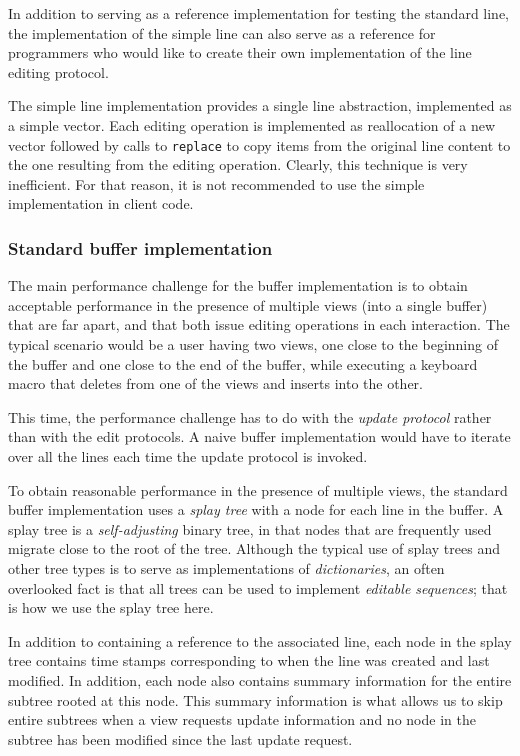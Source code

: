 In addition to serving as a reference implementation for testing the
standard line, the implementation of the simple line can also serve as
a reference for programmers who would like to create their own
implementation of the line editing protocol.

The simple line implementation provides a single line abstraction,
implemented as a \commonlisp{} simple vector.  Each editing operation
is implemented as reallocation of a new vector followed by calls to
\texttt{replace} to copy items from the original line content to the
one resulting from the editing operation.  Clearly, this technique is
very inefficient.  For that reason, it is not recommended to use the
simple implementation in client code.

\subsubsection{Standard buffer implementation}

The main performance challenge for the buffer implementation is to
obtain acceptable performance in the presence of multiple views (into
a single buffer) that are far apart, and that both issue editing
operations in each interaction.  The typical scenario would be a user
having two views, one close to the beginning of the buffer and one
close to the end of the buffer, while executing a keyboard macro that
deletes from one of the views and inserts into the other.

This time, the performance challenge has to do with the \emph{update
  protocol} rather than with the edit protocols.  A naive buffer
implementation would have to iterate over all the lines each time the
update protocol is invoked.

To obtain reasonable performance in the presence of multiple views,
the standard buffer implementation uses a \emph{splay tree}
\cite{Sleator:1985:SBS:3828.3835} with a node for each line in the
buffer.  A splay tree is a \emph{self-adjusting} binary tree, in that
nodes that are frequently used migrate close to the root of the tree.
Although the typical use of splay trees and other tree types is to
serve as implementations of \emph{dictionaries}, an often overlooked
fact is that all trees can be used to implement \emph{editable
  sequences}; that is how we use the splay tree here.

In addition to containing a reference to the associated line, each
node in the splay tree contains time stamps corresponding to when the
line was created and last modified.  In addition, each node also
contains summary information for the entire subtree rooted at this
node.  This summary information is what allows us to skip entire
subtrees when a view requests update information and no node in the
subtree has been modified since the last update request.

